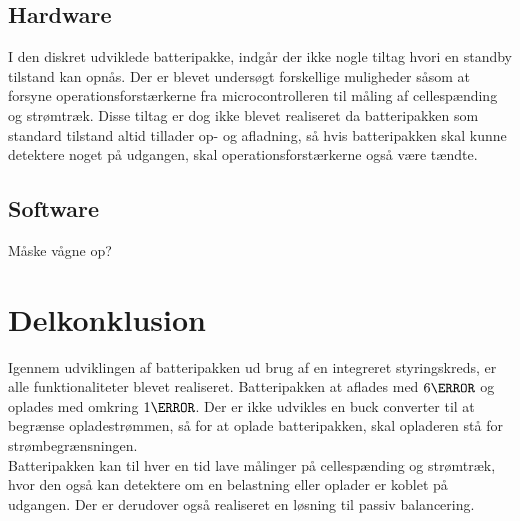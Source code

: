 \subsection{Hardware}
I den diskret udviklede batteripakke, indgår der ikke nogle tiltag hvori en standby tilstand kan opnås. Der er blevet undersøgt forskellige muligheder såsom at forsyne operationsforstærkerne fra microcontrolleren til måling af cellespænding og strømtræk. Disse tiltag er dog ikke blevet realiseret da batteripakken som standard tilstand altid tillader op- og afladning, så hvis batteripakken skal kunne detektere noget på udgangen, skal operationsforstærkerne også være tændte.


\subsection{Software}
Måske vågne op?

\section{Delkonklusion}
Igennem udviklingen af batteripakken ud brug af en integreret styringskreds, er alle funktionaliteter blevet realiseret. Batteripakken at aflades med $6\ampere$ og oplades med omkring $1\ampere$. Der er ikke udvikles en buck converter til at begrænse opladestrømmen, så for at oplade batteripakken, skal opladeren stå for strømbegrænsningen.
\\

Batteripakken kan til hver en tid lave målinger på cellespænding og strømtræk, hvor den også kan detektere om en belastning eller oplader er koblet på udgangen. Der er derudover også realiseret en løsning til passiv balancering.
